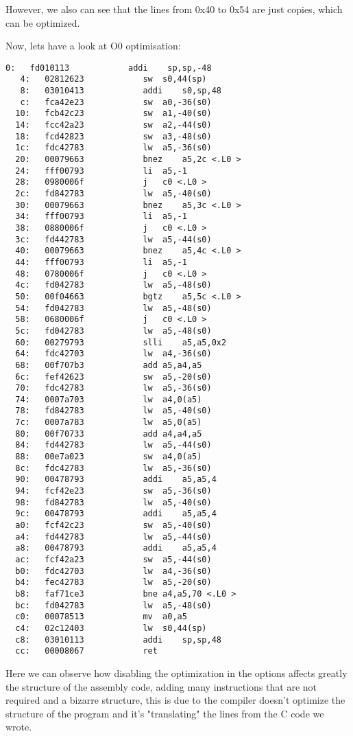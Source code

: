 \documentclass[a4paper]{article}
\begin{document}
However, we also can see that the lines from 0x40 to 0x54 are just copies, which can be optimized.

Now, lets have a look at O0 optimisation: 

\begin{lstlisting}[language={[x86masm]Assembler}, caption=Refined Objdump output with -O0 option]
   0:	fd010113          	addi	sp,sp,-48
   4:	02812623          	sw	s0,44(sp)
   8:	03010413          	addi	s0,sp,48
   c:	fca42e23          	sw	a0,-36(s0)
  10:	fcb42c23          	sw	a1,-40(s0)
  14:	fcc42a23          	sw	a2,-44(s0)
  18:	fcd42823          	sw	a3,-48(s0)
  1c:	fdc42783          	lw	a5,-36(s0)
  20:	00079663          	bnez	a5,2c <.L0 >
  24:	fff00793          	li	a5,-1
  28:	0980006f          	j	c0 <.L0 >
  2c:	fd842783          	lw	a5,-40(s0)
  30:	00079663          	bnez	a5,3c <.L0 >
  34:	fff00793          	li	a5,-1
  38:	0880006f          	j	c0 <.L0 >
  3c:	fd442783          	lw	a5,-44(s0)
  40:	00079663          	bnez	a5,4c <.L0 >
  44:	fff00793          	li	a5,-1
  48:	0780006f          	j	c0 <.L0 >
  4c:	fd042783          	lw	a5,-48(s0)
  50:	00f04663          	bgtz	a5,5c <.L0 >
  54:	fd042783          	lw	a5,-48(s0)
  58:	0680006f          	j	c0 <.L0 >
  5c:	fd042783          	lw	a5,-48(s0)
  60:	00279793          	slli	a5,a5,0x2
  64:	fdc42703          	lw	a4,-36(s0)
  68:	00f707b3          	add	a5,a4,a5
  6c:	fef42623          	sw	a5,-20(s0)
  70:	fdc42783          	lw	a5,-36(s0)
  74:	0007a703          	lw	a4,0(a5)
  78:	fd842783          	lw	a5,-40(s0)
  7c:	0007a783          	lw	a5,0(a5)
  80:	00f70733          	add	a4,a4,a5
  84:	fd442783          	lw	a5,-44(s0)
  88:	00e7a023          	sw	a4,0(a5)
  8c:	fdc42783          	lw	a5,-36(s0)
  90:	00478793          	addi	a5,a5,4
  94:	fcf42e23          	sw	a5,-36(s0)
  98:	fd842783          	lw	a5,-40(s0)
  9c:	00478793          	addi	a5,a5,4
  a0:	fcf42c23          	sw	a5,-40(s0)
  a4:	fd442783          	lw	a5,-44(s0)
  a8:	00478793          	addi	a5,a5,4
  ac:	fcf42a23          	sw	a5,-44(s0)
  b0:	fdc42703          	lw	a4,-36(s0)
  b4:	fec42783          	lw	a5,-20(s0)
  b8:	faf71ce3          	bne	a4,a5,70 <.L0 >
  bc:	fd042783          	lw	a5,-48(s0)
  c0:	00078513          	mv	a0,a5
  c4:	02c12403          	lw	s0,44(sp)
  c8:	03010113          	addi	sp,sp,48
  cc:	00008067          	ret
\end{lstlisting}

Here we can observe how disabling the optimization in the options affects greatly the structure of the assembly code, adding many instructions that are not required and a bizarre structure, this is due to the compiler doesn't optimize the structure of the program and it's "translating" the lines from the C code we wrote.
\end{document}
